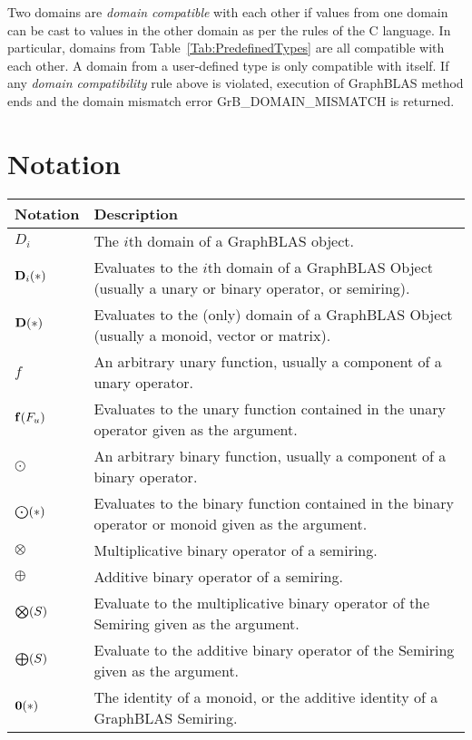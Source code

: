  Two domains are \emph{domain compatible} with each other if values from one domain can be cast to values in the other domain as per the rules of the C language. In particular, domains from Table~\ref{Tab:PredefinedTypes} are all compatible with each other. A domain from a user-defined type is only compatible with itself. If any \emph{domain compatibility} rule above is violated, execution of GraphBLAS method ends and the domain mismatch error {\sf GrB\_DOMAIN\_MISMATCH} is returned.

\glossEnd

\section{Notation}

\begin{tabular}{l|p{5in}}
Notation & Description \\
\hline
$D_i$           & The $i$th domain of a GraphBLAS object. \\
$\bold{D}_i(*)$ & Evaluates to the $i$th domain of a GraphBLAS Object (usually a unary or binary operator, or semiring). \\
$\bold{D}(*)$   & Evaluates to the (only) domain of a GraphBLAS Object (usually a monoid, vector or matrix). \\ 
$f$             & An arbitrary unary function, usually a component of a unary operator. \\
$\bold{f}(F_u)$ & Evaluates to the unary function contained in the unary operator given as the argument. \\
$\odot$         & An arbitrary binary function, usually a component of a binary operator. \\
$\bold{\bigodot}(*)$ & Evaluates to the binary function contained in the binary operator or monoid given as the argument. \\
$\otimes$       & Multiplicative binary operator of a semiring. \\
$\oplus$        & Additive binary operator of a semiring. \\
$\bold{\bigotimes}(S)$ & Evaluate to the multiplicative binary operator of the Semiring given as the argument. \\
$\bold{\bigoplus}(S)$ & Evaluate to the additive binary operator of the Semiring given as the argument. \\
$\bold{0}(*)$   & The identity of a monoid, or the additive identity of a GraphBLAS Semiring. \\

\end{tabular}
